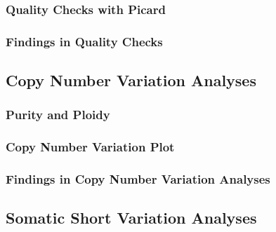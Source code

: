 \documentclass[11pt,a4paper,onecolumn,oneside]{report}
\begin{document}
            \subsubsection{Quality Checks with Picard}

            \subsubsection{Findings in Quality Checks}

        \subsection{Copy Number Variation Analyses}
            \subsubsection{Purity and Ploidy}

            \subsubsection{Copy Number Variation Plot}

            \subsubsection{Findings in Copy Number Variation Analyses}

        \subsection{Somatic Short Variation Analyses}
\end{document}
